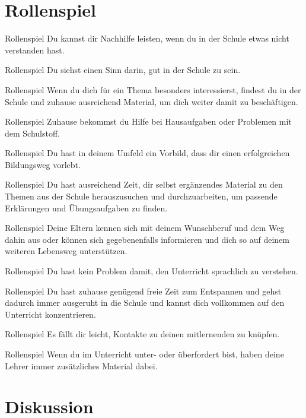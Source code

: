 \documentclass[14pt, usenames, dvipsnames, notesonly]{beamer}
\newcommand{\aussage}[1]{	\begin{frame}{Rollenspiel}
	\centering #1
	\end{frame}}
\begin{document}
\section{Rollenspiel}

	\aussage{Du kannst dir Nachhilfe leisten, wenn du in der Schule etwas nicht verstanden hast.}

    \aussage{Du siehst einen Sinn darin, gut in der Schule zu sein.}

	\aussage{Wenn du dich für ein Thema besonders interessierst, findest du in der Schule und zuhause ausreichend Material, um dich weiter damit zu beschäftigen.}

	\aussage{Zuhause bekommst du Hilfe bei Hausaufgaben oder Problemen mit dem Schulstoff.}

    \aussage{Du hast in deinem Umfeld ein Vorbild, dass dir einen erfolgreichen Bildungsweg vorlebt.}

	\aussage{Du hast ausreichend Zeit, dir selbst ergänzendes Material zu den Themen aus der Schule herauszusuchen und durchzuarbeiten, um passende Erklärungen und Übungsaufgaben zu finden.}

	\aussage{Deine Eltern kennen sich mit deinem Wunschberuf und dem Weg dahin aus oder können sich gegebenenfalls informieren und dich so auf deinem weiteren Lebensweg unterstützen.}

    \aussage{Du hast kein Problem damit, den Unterricht sprachlich zu verstehen.}

	\aussage{Du hast zuhause genügend freie Zeit zum Entspannen und gehst dadurch immer ausgeruht in die Schule und kannst dich vollkommen auf den Unterricht konzentrieren.}

    \aussage{Es fällt dir leicht, Kontakte zu deinen mitlernenden zu knüpfen.}
	
	\aussage{Wenn du im Unterricht unter- oder überfordert bist, haben deine Lehrer immer zusätzliches Material dabei.}

\section{Diskussion}


\end{document}
